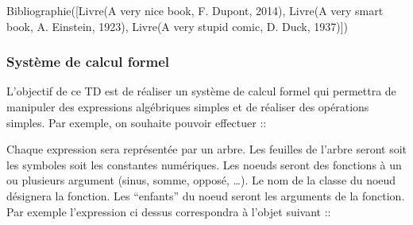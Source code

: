 \documentclass[letterpaper,10pt,english]{sphinxhowto}
\begin{document}
\begin{sphinxVerbatim}[commandchars=\\\{\}]
Bibliographie([Livre(\PYGZsq{}A very nice book\PYGZsq{}, \PYGZsq{}F. Dupont\PYGZsq{}, 2014), Livre(\PYGZsq{}A very smart book\PYGZsq{}, \PYGZsq{}A. Einstein\PYGZsq{}, 1923), Livre(\PYGZsq{}A very stupid comic\PYGZsq{}, \PYGZsq{}D. Duck\PYGZsq{}, 1937)])
\end{sphinxVerbatim}


\subsubsection{Système de calcul formel}
\label{\detokenize{cours6_objet_corr_exercices:systeme-de-calcul-formel}}
\sphinxAtStartPar
{}

\sphinxAtStartPar
L’objectif de ce TD est de réaliser un système de calcul formel qui permettra de manipuler des expressions algébriques simples et de réaliser des opérations simples. Par exemple, on souhaite pouvoir effectuer ::

\begin{sphinxVerbatim}[commandchars=\\\{\}]
  
  

    

 
\end{sphinxVerbatim}

\sphinxAtStartPar
Chaque expression sera représentée par un arbre. Les feuilles de l’arbre seront soit les symboles soit les constantes numériques. Les noeuds seront des fonctions à un ou plusieurs argument (sinus, somme, opposé, …). Le nom de la classe du noeud désignera la fonction. Les “enfants” du noeud seront les arguments de la fonction. Par exemple l’expression ci dessus correspondra à l’objet suivant ::
\end{document}
